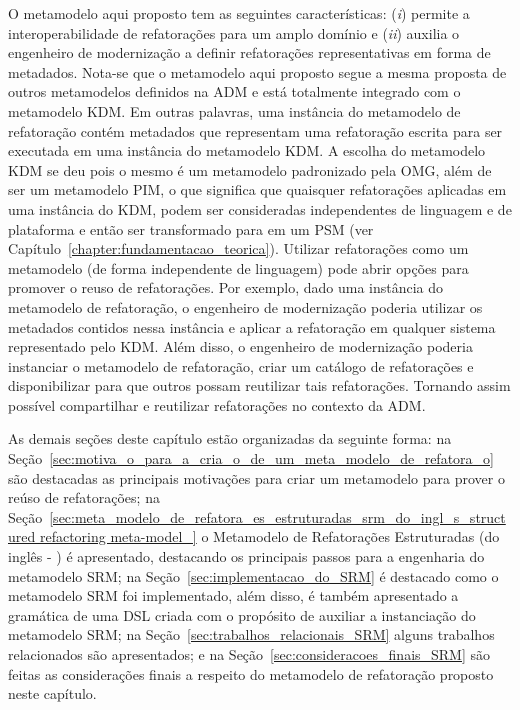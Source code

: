 O metamodelo aqui proposto tem as seguintes características: (\textit{i}) permite a interoperabilidade de refatorações para um amplo domínio e (\textit{ii}) auxilia o engenheiro de modernização a definir refatorações representativas em forma de metadados. Nota-se que o metamodelo aqui proposto segue a mesma proposta de outros metamodelos definidos na ADM e está totalmente integrado com o metamodelo KDM. Em outras palavras, uma instância do metamodelo de refatoração contém metadados que representam uma refatoração escrita para ser executada em uma instância do metamodelo KDM. A escolha do metamodelo KDM se deu pois o mesmo é um metamodelo padronizado pela OMG, além de ser um metamodelo PIM, o que significa que quaisquer refatorações aplicadas em uma instância do KDM, podem ser consideradas independentes de linguagem e de plataforma e então ser transformado para em um PSM (ver Capítulo~\ref{chapter:fundamentacao_teorica}). Utilizar refatorações como um metamodelo (de forma independente de linguagem) pode abrir opções para promover o reuso de refatorações. Por exemplo, dado uma instância do metamodelo de refatoração, o engenheiro de modernização poderia utilizar os metadados contidos nessa instância e aplicar a refatoração em qualquer sistema representado pelo KDM. Além disso, o engenheiro de modernização poderia instanciar o metamodelo de refatoração, criar um catálogo de refatorações e disponibilizar para que outros possam reutilizar tais refatorações. Tornando assim possível compartilhar e reutilizar refatorações no contexto da ADM.


As demais seções deste capítulo estão organizadas da seguinte forma: na Seção~\ref{sec:motiva_o_para_a_cria_o_de_um_meta_modelo_de_refatora_o} são destacadas as principais motivações para criar um metamodelo para prover o reúso de refatorações; na Seção~\ref{sec:meta_modelo_de_refatora_es_estruturadas_srm_do_ingl_s_structured refactoring meta-model_} o Metamodelo de Refatorações Estruturadas (do inglês - ) é apresentado, destacando os principais passos para a engenharia do metamodelo SRM; na Seção~\ref{sec:implementacao_do_SRM}  é destacado como o metamodelo SRM foi implementado, além disso, é também apresentado a gramática de uma DSL criada com o propósito de auxiliar a instanciação do metamodelo SRM; na Seção~\ref{sec:trabalhos_relacionais_SRM} alguns trabalhos relacionados são apresentados; e na Seção~\ref{sec:consideracoes_finais_SRM} são feitas as considerações finais a respeito do metamodelo de refatoração proposto neste capítulo.

